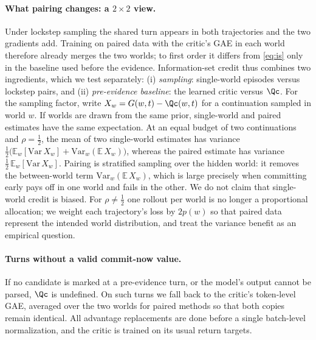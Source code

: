 \paragraph{What pairing changes: a $2{\times}2$ view.}
Under lockstep sampling the shared turn appears in both trajectories and the two gradients add.
Training on paired data with the critic's GAE in each world therefore already merges the two worlds; to first order it differs from \cref{eq:is} only in the baseline used before the evidence.
Information-set credit thus combines two ingredients, which we test separately:
(i) \emph{sampling}: single-world episodes versus lockstep pairs, and
(ii) \emph{pre-evidence baseline}: the learned critic versus $\Qc$.
For the sampling factor, write $X_w = G(w, t) - \Qc(w, t)$ for a continuation sampled in world $w$.
If worlds are drawn from the same prior, single-world and paired estimates have the same expectation.
At an equal budget of two continuations and $\rho = \tfrac12$, the mean of two single-world estimates has variance $\tfrac12\big(\mathbb{E}_w[\mathrm{Var}\,X_w] + \mathrm{Var}_w(\mathbb{E}\,X_w)\big)$, whereas the paired estimate has variance $\tfrac12\,\mathbb{E}_w[\mathrm{Var}\,X_w]$.
Pairing is stratified sampling over the hidden world: it removes the between-world term $\mathrm{Var}_w(\mathbb{E}\,X_w)$, which is large precisely when committing early pays off in one world and fails in the other.
We do not claim that single-world credit is biased.
For $\rho \neq \tfrac12$ one rollout per world is no longer a proportional allocation; we weight each trajectory's loss by $2p(w)$ so that paired data represent the intended world distribution, and treat the variance benefit as an empirical question.

\paragraph{Turns without a valid commit-now value.}
If no candidate is marked at a pre-evidence turn, or the model's output cannot be parsed, $\Qc$ is undefined.
On such turns we fall back to the critic's token-level GAE, averaged over the two worlds for paired methods so that both copies remain identical.
All advantage replacements are done before a single batch-level normalization, and the critic is trained on its usual return targets.

